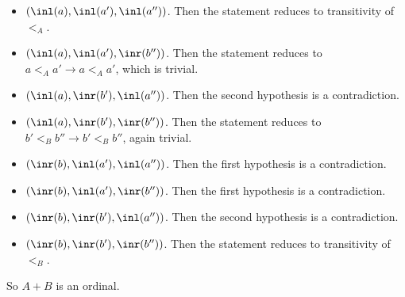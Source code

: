 \begin{itemize}
\item  $(\inl(a), \inl(a'), \inl(a''))$.  Then the statement reduces to
   transitivity of $<_{A}$.

\item  $(\inl(a), \inl(a'), \inr(b''))$.  Then the statement reduces to $a <_{A}
   a' \to a <_{A} a'$, which is trivial.

\item  $(\inl(a), \inr(b'), \inl(a''))$.  Then the second hypothesis is a
    contradiction.

\item  $(\inl(a), \inr(b'), \inr(b''))$.  Then the statement reduces to $b' <_{B}
   b'' \to b' <_{B} b''$, again trivial.

\item  $(\inr(b), \inl(a'), \inl(a''))$.  Then the first hypothesis is a
     contradiction.

\item  $(\inr(b), \inl(a'), \inr(b''))$.  Then the first hypothesis is a
     contradiction.

\item  $(\inr(b), \inr(b'), \inl(a''))$.  Then the second hypothesis is a
     contradiction.

\item  $(\inr(b), \inr(b'), \inr(b''))$.  Then the statement reduces to
     transitivity of $<_{B}$.

\end{itemize}
So $A + B$ is an ordinal.
